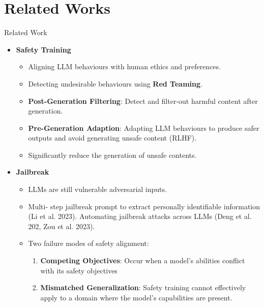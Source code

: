 \section{Related Works}
\begin{frame}{Related Work}
    \begin{itemize}
        \item \textbf{Safety Training}
        \begin{itemize}
            \item Aligning LLM behaviours with human ethics and preferences.
            \item Detecting undesirable behaviours using \textbf{Red Teaming}.
            \item \textbf{Post-Generation Filtering}: Detect and filter-out harmful content after generation.
            \item \textbf{Pre-Generation Adaption}: Adapting LLM behaviours to produce safer outputs and avoid generating unsafe content (RLHF).
            \item Significantly reduce the generation of unsafe contents.
        \end{itemize}
        
        \item \textbf{Jailbreak}
        \begin{itemize}
            \item LLMs are still vulnerable adversarial inputs.
            \item Multi- step jailbreak prompt to extract personally identifiable information (Li et al. 2023). Automating jailbreak attacks across LLMs (Deng et al. 202, Zou et al. 2023).
            \item Two failure modes of safety alignment:
            \begin{enumerate}
                \item \textbf{Competing Objectives}: Occur when a model’s abilities conflict with its safety objectives

                \item \textbf{Mismatched Generalization}: Safety training cannot effectively apply to a domain where the model’s capabilities are present.
                
            \end{enumerate}
        \end{itemize}
    \end{itemize}
\end{frame}